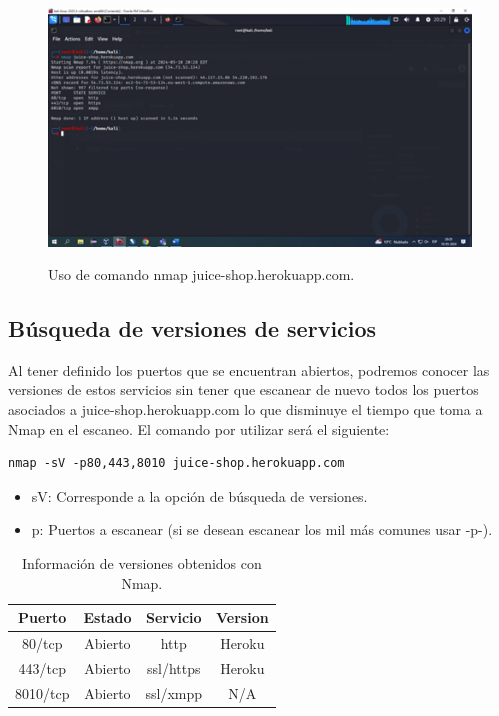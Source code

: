 \documentclass[stu, 11pt, letterpaper, donotrepeattitle, floatsintext, natbib]{apa7}
\begin{document}
\begin{figure}[H]
    \centering
    \caption{Uso de comando nmap juice-shop.herokuapp.com.}
    \includegraphics[width=0.75\linewidth]{Imagen1.png} %
    \label{fig:OverallEffect}
\end{figure}


\subsection{Búsqueda de versiones de servicios} 
Al tener definido los puertos que se encuentran abiertos, podremos conocer las versiones de estos servicios sin tener que escanear de nuevo todos los puertos asociados a juice-shop.herokuapp.com lo que disminuye el tiempo que toma a Nmap en el escaneo. El comando por utilizar será el siguiente:
\newline

\begin{lstlisting}
nmap -sV -p80,443,8010 juice-shop.herokuapp.com
\end{lstlisting}

\begin{itemize}
  \item sV: Corresponde a la opción de búsqueda de versiones.
  \item p: Puertos a escanear (si se desean escanear los mil más comunes usar -p-).
\end{itemize}


\begin{table}[H]
    \caption{Información de versiones obtenidos con Nmap.}
    \centering
    \begin{tabular}{cccc} %
        \hline 
         Puerto & Estado & Servicio & Version\\
         \hline
         80/tcp & Abierto & http & Heroku\\
          443/tcp & Abierto & ssl/https & Heroku\\
	8010/tcp & Abierto & ssl/xmpp & N/A\\
         \hline
    \end{tabular}
    \label{tab:table_words}
\end{table}
\end{document}
